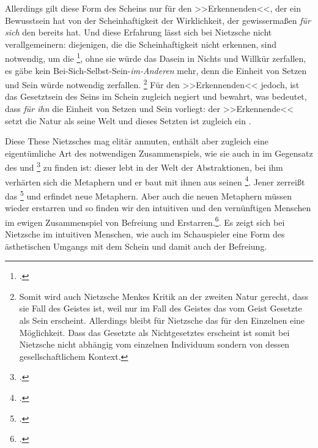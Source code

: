 \documentclass[12pt, a4paper, openany]{report}
\begin{document}
Allerdings gilt diese Form des Scheins nur für den >>Erkennenden<<, der ein Bewusstsein hat von der Scheinhaftigkeit der Wirklichkeit, der gewissermaßen \emph{für sich} den  bereits  hat.
Und diese Erfahrung lässt sich bei Nietzsche nicht verallgemeinern:
diejenigen, die die Scheinhaftigkeit nicht erkennen, sind notwendig, um die \footcite[][417]{nietzsche_morgenrote_1999}, ohne sie würde das Dasein in Nichts und Willkür zerfallen, es gäbe kein Bei-Sich-Selbst-Sein-\emph{im-Anderen} mehr, denn die Einheit von Setzen und Sein würde notwendig zerfallen.%
\footnote{
    Somit wird auch Nietzsche Menkes Kritik an der zweiten Natur gerecht, dass sie Fall des Geistes ist, weil nur im Fall des Geistes das vom Geist Gesetzte als Sein erscheint. 
    Allerdings bleibt für Nietzsche das für den Einzelnen eine Möglichkeit. 
    Dass das Gesetzte als Nichtgesetztes erscheint ist somit bei Nietzsche nicht abhängig vom einzelnen Individuum sondern von dessen gesellschaftlichem Kontext.
} 
Für den >>Erkennenden<< jedoch, ist das Gesetztsein des Seins im Schein zugleich negiert und bewahrt, was bedeutet, dass \emph{für ihn} die Einheit von Setzen und Sein vorliegt:
der >>Erkennende<< setzt die Natur als seine Welt und dieses Setzten ist zugleich ein . 

Diese These Nietzsches mag elitär anmuten, enthält aber zugleich eine eigentümliche Art des notwendigen Zusammenspiels, wie sie auch in  im Gegensatz des  und \footcite[][889]{nietzsche_geburt_1999} zu finden ist: 
dieser lebt in der Welt der Abstraktionen, bei ihm verhärten sich die Metaphern und er baut mit ihnen aus  seinen \footcite[][S. 882ff.]{nietzsche_geburt_1999}.
Jener zerreißt das \footcite[][S. 877ff.]{nietzsche_geburt_1999} und erfindet neue Metaphern.
Aber auch die neuen Metaphern müssen wieder erstarren und so finden wir den intuitiven und den vernünftigen Menschen im ewigen Zusammenspiel von Befreiung und Erstarren.\footcite[Vergleiche dazu auch: ][62]{stephan_nietzscheanismus_2019}.
Es zeigt sich bei Nietzsche im intuitiven Menschen, wie auch im Schauspieler eine Form des ästhetischen Umgangs mit dem Schein und damit auch der Befreiung. 
\\
\end{document}
